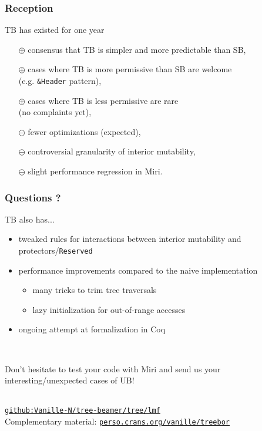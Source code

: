 \begin{frame}
    \frametitle{Reception}
    TB has existed for one year
    \begin{itemize}
        \item[$\oplus$] consensus that TB is simpler and more predictable than SB,
        \item[$\oplus$] cases where TB is more permissive than SB are welcome \\ (e.g. \texttt{\&Header} pattern),
        \item[$\oplus$] cases where TB is less permissive are rare \\ (no complaints yet),
        \item[$\ominus$] fewer optimizations (expected),
        \item[$\ominus$] controversial granularity of interior mutability,
        \item[$\ominus$] slight performance regression in Miri.
    \end{itemize}
\end{frame}

\begin{frame}
    \frametitle{Questions ?}

    TB also has...
    \begin{itemize}
        \item tweaked rules for interactions between interior mutability and protectors/\texttt{Reserved}
        \item performance improvements compared to the naive implementation
            \begin{itemize}
                \item many tricks to trim tree traversals
                \item lazy initialization for out-of-range accesses
            \end{itemize}
        \item ongoing attempt at formalization in Coq
    \end{itemize}~\\
    \vfill

    Don't hesitate to test your code with Miri and send us your interesting/unexpected cases of UB!\\~\\
    \vfill

    \href{https://github.com/Vanille-N/tree-beamer/tree/lmf}{\texttt{github:Vanille-N/tree-beamer/tree/lmf}}\\
    Complementary material: \href{https://perso.crans.org/vanille/treebor}{\texttt{perso.crans.org/vanille/treebor}}\\
\end{frame}
